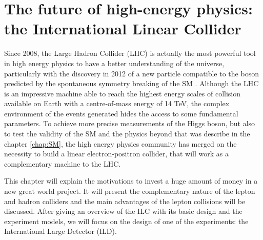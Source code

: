 \chapter{The future of high-energy physics: the International Linear Collider}
\label{chap:ILC}


  Since 2008, the Large Hadron Collider (LHC) is actually the most powerful tool in high energy physics to have a better understanding of the universe, particularly with the discovery in 2012 of a new particle compatible to the boson predicted by the spontaneous symmetry breaking of the SM \cite{Aad2012, Chatrchyan2012}.
  Although the LHC is an impressive machine able to reach the highest energy scales of collision available on Earth with a centre-of-mass energy of 14 TeV, the complex environment of the events generated hides the access to some fundamental parameters. 
  To achieve more precise measurements of the Higgs boson, but also to test the validity of the SM and the physics beyond that was describe in the chapter \ref{chap:SM}, the high energy physics community has merged on the necessity to build a linear electron-positron collider, that will work as a complementary machine to the LHC.
  
  This chapter will explain the motivations to invest a huge amount of money in a new great world project. It will present the complementary nature of the lepton and hadron colliders and the main advantages of the lepton collisions will be discussed.
  After giving an overview of the ILC with its basic design and the experiment models, we will focus on the design of one of the experiments: the International Large Detector (ILD).

 \minitoc
  

